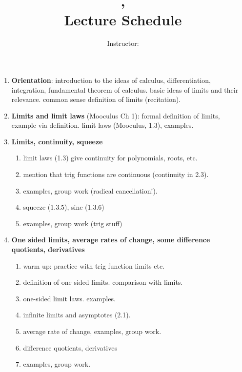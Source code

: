 \documentclass[12pt]{amsart}
\title{\course, \semester \\ Lecture Schedule}
\author{Instructor: \instructor}
\begin{document}
\maketitle

\begin{enumerate}[1. ]

\item \textbf{Orientation}: introduction to the ideas of calculus, differentiation,
integration, fundamental theorem of calculus. basic ideas of limits and
their relevance. common sense definition of limits (recitation).
\item \textbf{Limits and limit laws} (Mooculus Ch 1): formal definition of
limits, example via definition. limit laws (Mooculus, 1.3), examples.
\item \textbf{Limits, continuity, squeeze}
\begin{enumerate}[ \ \  i. ]
\item
limit laws (1.3) give continuity for polynomials, roots, etc. 
\item
mention that trig functions are continuous (continuity in 2.3).
\item
examples, group work (radical cancellation!).
\item
squeeze (1.3.5), sine (1.3.6)
\item
examples, group work (trig stuff)
\end{enumerate}
\item \textbf{One sided limits, average rates of change, some difference
quotients, derivatives}
\begin{enumerate}[ \ \  i. ]
\item
warm up: practice with trig function limits etc.
\item
definition of one sided limits. comparison with limits.
\item
one-sided limit laws. examples.
\item
infinite limits and asymptotes (2.1).
\item
average rate of change, examples, group work.
\item
difference quotients, derivatives
\item
examples, group work.
\end{enumerate}

\end{enumerate}
\end{document}
